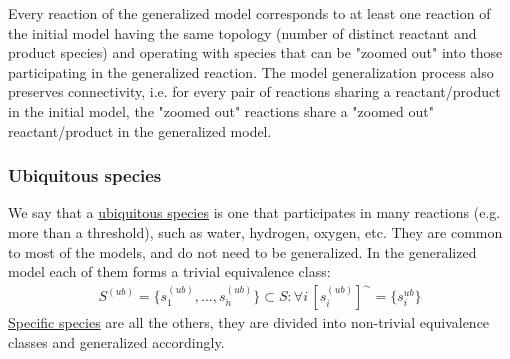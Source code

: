 \documentclass[10pt]{bmc_article}
\newenvironment{bmcformat}{\baselineskip20pt\sloppy\setboolean{publ}{false}}{\baselineskip20pt\sloppy}
\begin{document}
\begin{bmcformat}
Every reaction of the generalized model corresponds to at least one reaction of the initial model having the same topology (number of distinct reactant and product species) and operating with species that can be "zoomed out" into those participating in the generalized reaction. The model generalization process also preserves connectivity, i.e. for every pair of reactions sharing a reactant/product in the initial model, the "zoomed out" reactions share a "zoomed out" reactant/product in the generalized model.



\subsubsection*{Ubiquitous species}

We say that a \underline{ubiquitous species} is one that participates in many reactions (e.g. more than a threshold), such as water, hydrogen, oxygen, etc. They are common to most of the models, and do not need to be generalized. In the generalized model each of them forms a trivial equivalence class:
\begin{align*}
S^{(ub)} = \{s^{(ub)}_1, \ldots, s^{(ub)}_{\breve{n}}\} \subset S: \forall i\,[s^{(ub)}_i]^{\sim} = \{s^{ub}_i\}
\end{align*}
\underline{Specific species} are all the others, they are divided into non-trivial equivalence classes and generalized accordingly.  


\end{bmcformat}
\end{document}
